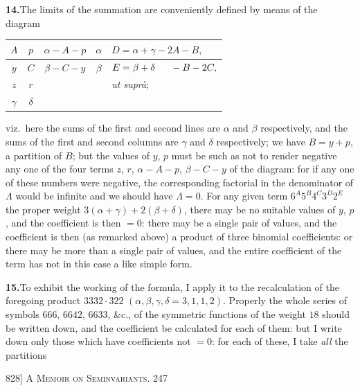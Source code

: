 \documentclass[11pt]{article}
\begin{document}
\medskip
\noindent\textbf{14.}\quad The limits of the summation are conveniently defined by
means of the diagram
\medskip
\begin{center}
\begin{tabular}{|c|c|c|c|l|}
\hline
$A$ & $p$ & $\alpha-A-p$ & $\alpha$ & $D=\alpha+\gamma-2A-B,$\\ \hline
$y$ & $C$ & $\beta-C-y$ & $\beta$ & $E=\beta+\delta\hphantom{-B}-B-2C,$\\ \hline
$z$ & $r$ & & & \textit{ut supr\`a};\\ \hline
$\gamma$ & $\delta$ & & & \\ \hline
\end{tabular}
\end{center}

\medskip
\noindent viz.\ here the sums of the first and second lines are $\alpha$ and $\beta$
respectively, and the sums of the first and second columns are $\gamma$ and $\delta$
respectively; we have $B=y+p$, a partition of $B$; but the values of $y$, $p$ must
be such as not to render negative any one of the four terms $z$, $r$, $\alpha-A-p$,
$\beta-C-y$ of the diagram: for if any one of these numbers were negative, the
corresponding factorial in the denominator of $\Lambda$ would be infinite and we should
have $\Lambda=0$. For any given term $6^{A}5^{B}4^{C}3^{D}2^{E}$ the proper weight
$3(\alpha+\gamma)+2(\beta+\delta)$, there may be no suitable values of $y$, $p$, and the
coefficient is then $=0$: there may be a single pair of values, and the coefficient is
then (as remarked above) a product of three binomial coefficients: or there may be
more than a single pair of values, and the entire coefficient of the term has not in
this case a like simple form.

\medskip
\noindent\textbf{15.}\quad To exhibit the working of the formula, I apply it to the
recalculation of the foregoing product $3332\cdot 322$ $(\alpha, \beta, \gamma, \delta=3,
1, 1, 2)$. Properly the whole series of symbols $666$, $6642$, $6633$, \&c., of the
symmetric functions of the weight $18$ should be written down, and the coefficient
be calculated for each of them: but I write down only those which have coefficients
not $=0$: for each of these, I take \emph{all} the partitions

\newpage
\noindent\textsc{828] \hfill A Memoir on Seminvariants. \hfill 247}
\vspace{0.6em}
\end{document}
